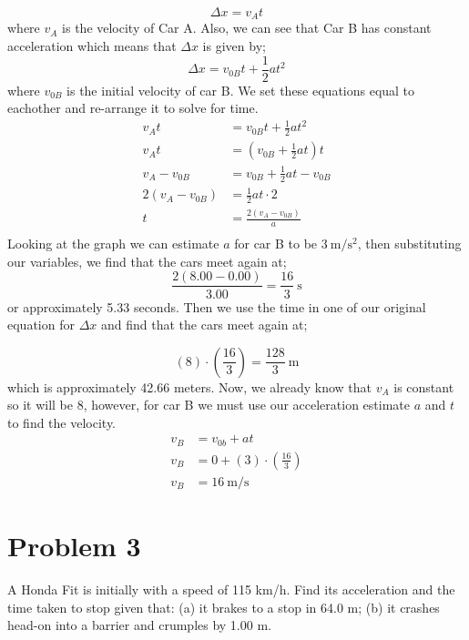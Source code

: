 \documentclass{article}
\begin{document}
\[
	\Delta x = v_A t
\]
where $v_A$ is the velocity of Car A. Also, we can see that Car B has constant acceleration which means that $\Delta x$ is given by;
\[
	\Delta x = v_{0B} t + \frac{1}{2} a t^2
\]
where $v_{0B}$ is the initial velocity of car B. We set these equations equal to eachother and re-arrange it to solve for time.
\begin{align*}
	v_A t &= v_{0B} t + \frac{1}{2} a t^2 \\
	v_A t &= \left( v_{0B} + \frac{1}{2} a t \right) t \\
	v_A - v_{0B} &= v_{0B} + \frac{1}{2} a t  - v_{0B} \\
	2 \left( v_A - v_{0B} \right) &= \frac{1}{2} a t \cdot 2 \\
	t &= \frac{2 \left( v_A - v_{0B} \right)}{a} \\
\end{align*}
Looking at the graph we can estimate $a$ for car B to be $3\ \unit{\meter\per\second^2}$, then substituting our variables, we find that the cars meet again at;
\[
	\frac{2 \left( 8.00 - 0.00 \right)}{3.00} = \frac{16}{3}\ \unit{\second}
\]
or approximately 5.33 seconds. Then we use the time in one of our original equation for $\Delta x$ and find that the cars meet again at;

\[
	\left( 8 \right) \cdot \left(\frac{16}{3}\right) = \frac{128}{3}\ \unit{\meter}
\]
which is approximately 42.66 meters. Now, we already know that $v_A$ is constant so it will be 8, however, for car B we must use our acceleration estimate $a$ and $t$ to find the velocity.
\begin{align*}
	v_B &= v_{0b} + at \\
	v_B &= 0 + \left( 3 \right) \cdot \left( \frac{16}{3} \right) \\
	v_B &= 16\ \unit{\meter\per\second}
\end{align*}

\section*{Problem 3}
A Honda Fit is initially with a speed of 115 km/h. Find its acceleration and the time taken
to stop given that: (a) it brakes to a stop in 64.0 m; (b) it crashes head-on into a barrier and
crumples by 1.00 m.
\end{document}
